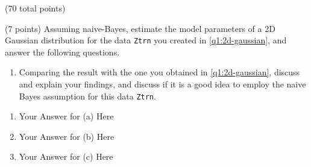 \documentclass[12pt]{article}
\begin{document}
\begin{question}{(70 total points) \qOneTitle}
\begin{subquestion}{(7 points)
    Assuming naive-Bayes, estimate the model parameters of a 2D Gaussian distribution for the data {\tt Ztrn} you created in \ref{q1:2d-gaussian}, and answer the following questions.
  }
\begin{enumerate}
  \item Comparing the result with the one you obtained in \ref{q1:2d-gaussian}, discuss and explain your findings, and discuss if it is a good idea to employ the naive Bayes assumption for this data {\tt Ztrn}.
  \end{enumerate}
   

  \begin{answerbox}{0.75\textheight}
    \begin{enumerate}
    \item Your Answer for (a) Here
    \item Your Answer for (b) Here
    \item Your Answer for (c) Here
    \end{enumerate}
  \end{answerbox}
  


\end{subquestion}


\end{question}
\clearpage
%
% 
\newcommand{\qTwoTitle}{Experiments on an image data set of handwritten letters}
%
\end{document}
